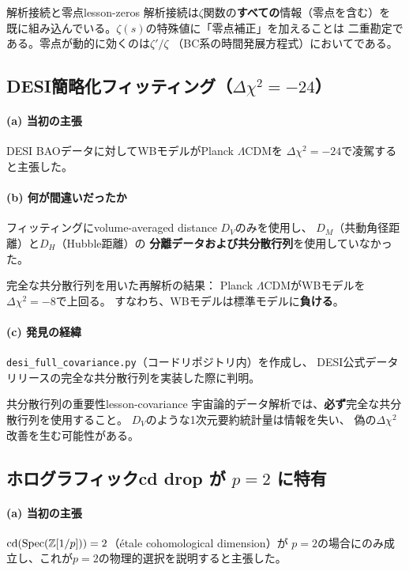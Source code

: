 \begin{keylesson}{解析接続と零点}{lesson-zeros}
解析接続は$\zeta$関数の\textbf{すべての}情報（零点を含む）を
既に組み込んでいる。$\zeta(s)$の特殊値に「零点補正」を加えることは
二重勘定である。零点が動的に効くのは$\zeta'/\zeta$
（BC系の時間発展方程式）においてである。
\end{keylesson}


\subsection{DESI簡略化フィッティング（$\Delta\chi^2 = -24$）}
\label{sec:15.2}

\paragraph{(a) 当初の主張}
DESI BAOデータに対してWBモデルがPlanck $\Lambda$CDMを
$\Delta\chi^2 = -24$で凌駕すると主張した。

\paragraph{(b) 何が間違いだったか}
フィッティングにvolume-averaged distance $D_V$のみを使用し、
$D_M$（共動角径距離）と$D_H$（Hubble距離）の
\textbf{分離データおよび共分散行列}を使用していなかった。

完全な共分散行列を用いた再解析の結果：
Planck $\Lambda$CDMがWBモデルを$\Delta\chi^2 = -8$で上回る。
すなわち、WBモデルは標準モデルに\textbf{負ける}。

\paragraph{(c) 発見の経緯}
\texttt{desi\_full\_covariance.py}（コードリポジトリ内）を作成し、
DESI公式データリリースの完全な共分散行列を実装した際に判明。

\begin{keylesson}{共分散行列の重要性}{lesson-covariance}
宇宙論的データ解析では、\textbf{必ず}完全な共分散行列を使用すること。
$D_V$のような1次元要約統計量は情報を失い、
偽の$\Delta\chi^2$改善を生む可能性がある。
\end{keylesson}


\subsection{ホログラフィックcd drop が $p=2$ に特有}
\label{sec:15.3}

\paragraph{(a) 当初の主張}
$\operatorname{cd}(\operatorname{Spec}(\mathbb{Z}[1/p])) = 2$（\'etale cohomological dimension）が
$p = 2$の場合にのみ成立し、これが$p = 2$の物理的選択を説明すると主張した。

